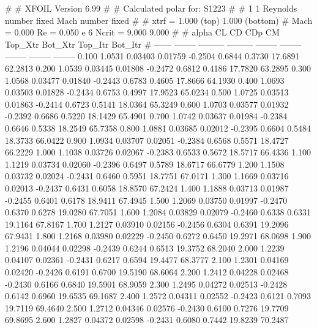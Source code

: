 #  
#       XFOIL         Version 6.99
#  
# Calculated polar for: S1223                                           
#  
# 1 1 Reynolds number fixed          Mach number fixed         
#  
# xtrf =   1.000 (top)        1.000 (bottom)  
# Mach =   0.000     Re =     0.050 e 6     Ncrit =   9.000  9.000
#  
#   alpha    CL        CD       CDp       CM     Top_Xtr  Bot_Xtr  Top_Itr  Bot_Itr
#  ------ -------- --------- --------- -------- -------- -------- -------- --------
   0.100   1.0531   0.03403   0.01759  -0.2504   0.6844   0.3730  17.6891  62.2813
   0.200   1.0539   0.03445   0.01808  -0.2472   0.6812   0.4186  17.7820  63.2895
   0.300   1.0568   0.03477   0.01840  -0.2443   0.6783   0.4605  17.8666  64.1930
   0.400   1.0693   0.03503   0.01828  -0.2434   0.6753   0.4997  17.9523  65.0234
   0.500   1.0725   0.03513   0.01863  -0.2414   0.6723   0.5141  18.0364  65.3249
   0.600   1.0703   0.03577   0.01932  -0.2392   0.6686   0.5220  18.1429  65.4901
   0.700   1.0742   0.03637   0.01984  -0.2384   0.6646   0.5338  18.2549  65.7358
   0.800   1.0881   0.03685   0.02012  -0.2395   0.6604   0.5484  18.3733  66.0422
   0.900   1.0934   0.03707   0.02051  -0.2384   0.6568   0.5571  18.4727  66.2229
   1.000   1.1038   0.03726   0.02067  -0.2383   0.6533   0.5672  18.5717  66.4336
   1.100   1.1219   0.03734   0.02060  -0.2396   0.6497   0.5789  18.6717  66.6779
   1.200   1.1508   0.03732   0.02024  -0.2431   0.6460   0.5951  18.7751  67.0171
   1.300   1.1669   0.03716   0.02013  -0.2437   0.6431   0.6058  18.8570  67.2424
   1.400   1.1888   0.03713   0.01987  -0.2455   0.6401   0.6178  18.9411  67.4945
   1.500   1.2069   0.03750   0.01997  -0.2470   0.6370   0.6278  19.0280  67.7051
   1.600   1.2084   0.03829   0.02079  -0.2460   0.6338   0.6331  19.1164  67.8167
   1.700   1.2127   0.03910   0.02156  -0.2456   0.6304   0.6391  19.2096  67.9431
   1.800   1.2168   0.03980   0.02229  -0.2450   0.6272   0.6450  19.2971  68.0698
   1.900   1.2196   0.04044   0.02298  -0.2439   0.6244   0.6513  19.3752  68.2040
   2.000   1.2239   0.04107   0.02361  -0.2431   0.6217   0.6594  19.4477  68.3777
   2.100   1.2301   0.04169   0.02420  -0.2426   0.6191   0.6700  19.5190  68.6064
   2.200   1.2412   0.04228   0.02468  -0.2430   0.6166   0.6840  19.5901  68.9059
   2.300   1.2495   0.04272   0.02513  -0.2428   0.6142   0.6960  19.6535  69.1687
   2.400   1.2572   0.04311   0.02552  -0.2423   0.6121   0.7093  19.7119  69.4640
   2.500   1.2712   0.04346   0.02576  -0.2430   0.6100   0.7276  19.7709  69.8695
   2.600   1.2827   0.04372   0.02598  -0.2431   0.6080   0.7442  19.8239  70.2487
